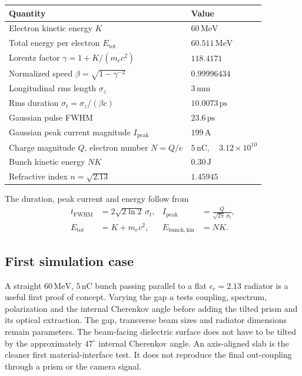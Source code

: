 \documentclass[11pt,a4paper]{article}
\newcommand{\unit}[1]{\,\mathrm{#1}}
\numberwithin{equation}{section}
\begin{document}
\begin{center}
\renewcommand{\arraystretch}{1.14}
\begin{tabularx}{\linewidth}{@{}Y l@{}}
\toprule
Quantity & Value\\
\midrule
Electron kinetic energy \(K\) & \(60\unit{MeV}\)\\
Total energy per electron \(E_{\mathrm{tot}}\) & \(60.511\unit{MeV}\)\\
Lorentz factor \(\gamma=1+K/(m_ec^2)\) & \(118.4171\)\\
Normalized speed \(\beta=\sqrt{1-\gamma^{-2}}\) & \(0.99996434\)\\
Longitudinal rms length \(\sigma_z\) & \(3\unit{mm}\)\\
Rms duration \(\sigma_t=\sigma_z/(\beta c)\) & \(10.0073\unit{ps}\)\\
Gaussian pulse FWHM & \(23.6\unit{ps}\)\\
Gaussian peak current magnitude \(I_{\mathrm{peak}}\) & \(199\unit{A}\)\\
Charge magnitude \(Q\), electron number \(N=Q/e\) &
\(5\unit{nC},\quad 3.12\times10^{10}\)\\
Bunch kinetic energy \(NK\) & \(0.30\unit{J}\)\\
Refractive index \(n=\sqrt{2.13}\) & \(1.45945\)\\
\bottomrule
\end{tabularx}
\end{center}

The duration, peak current and energy follow from
\begin{align}
 t_{\mathrm{FWHM}}&=2\sqrt{2\ln2}\,\sigma_t,&
 I_{\mathrm{peak}}&=\frac{Q}{\sqrt{2\pi}\,\sigma_t},\\
 E_{\mathrm{tot}}&=K+m_ec^2,&
 E_{\mathrm{bunch,kin}}&=NK.
\end{align}

\subsection{First simulation case}

A straight \(60\unit{MeV}\), \(5\unit{nC}\) bunch passing parallel to a flat
\(\epsilon_r=2.13\) radiator is a useful first proof of concept. Varying the
gap \(a\) tests coupling, spectrum, polarization and the internal Cherenkov
angle before adding the tilted prism and its optical extraction.
The gap, transverse beam sizes and radiator dimensions remain parameters.
The beam-facing dielectric surface does not have to be tilted by the
approximately \(47^\circ\) internal Cherenkov angle. An axis-aligned slab is
the cleaner first material-interface test. It does not reproduce the final
out-coupling through a prism or the camera signal.
\end{document}

